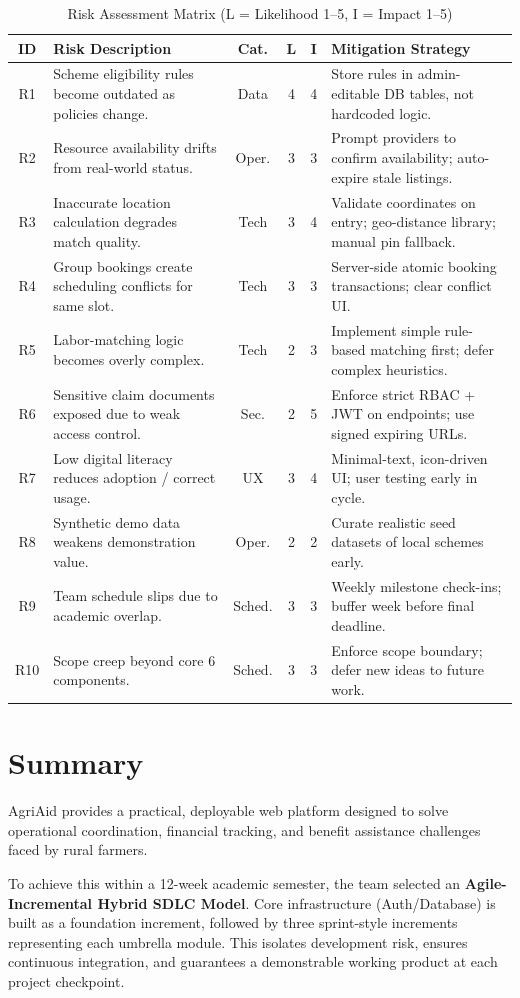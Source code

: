 \documentclass[11pt,a4paper]{article}
\begin{document}
\begin{table}[h!]
\centering
\small
\begin{tabularx}{\textwidth}{c X c c c X}
\toprule
\textbf{ID} & \textbf{Risk Description} & \textbf{Cat.} & \textbf{L} & \textbf{I} & \textbf{Mitigation Strategy} \\
\midrule
R1 & Scheme eligibility rules become outdated as policies change. & Data & 4 & 4 & Store rules in admin-editable DB tables, not hardcoded logic. \\
R2 & Resource availability drifts from real-world status. & Oper. & 3 & 3 & Prompt providers to confirm availability; auto-expire stale listings. \\
R3 & Inaccurate location calculation degrades match quality. & Tech & 3 & 4 & Validate coordinates on entry; geo-distance library; manual pin fallback. \\
R4 & Group bookings create scheduling conflicts for same slot. & Tech & 3 & 3 & Server-side atomic booking transactions; clear conflict UI. \\
R5 & Labor-matching logic becomes overly complex. & Tech & 2 & 3 & Implement simple rule-based matching first; defer complex heuristics. \\
R6 & Sensitive claim documents exposed due to weak access control. & Sec. & 2 & 5 & Enforce strict RBAC + JWT on endpoints; use signed expiring URLs. \\
R7 & Low digital literacy reduces adoption / correct usage. & UX & 3 & 4 & Minimal-text, icon-driven UI; user testing early in cycle. \\
R8 & Synthetic demo data weakens demonstration value. & Oper. & 2 & 2 & Curate realistic seed datasets of local schemes early. \\
R9 & Team schedule slips due to academic overlap. & Sched. & 3 & 3 & Weekly milestone check-ins; buffer week before final deadline. \\
R10 & Scope creep beyond core 6 components. & Sched. & 3 & 3 & Enforce scope boundary; defer new ideas to future work. \\
\bottomrule
\end{tabularx}
\caption{Risk Assessment Matrix (L = Likelihood 1--5, I = Impact 1--5)}
\end{table}

\section{Summary}
AgriAid provides a practical, deployable web platform designed to solve operational coordination, financial tracking, and benefit assistance challenges faced by rural farmers.

To achieve this within a 12-week academic semester, the team selected an \textbf{Agile-Incremental Hybrid SDLC Model}. Core infrastructure (Auth/Database) is built as a foundation increment, followed by three sprint-style increments representing each umbrella module. This isolates development risk, ensures continuous integration, and guarantees a demonstrable working product at each project checkpoint.
\end{document}
